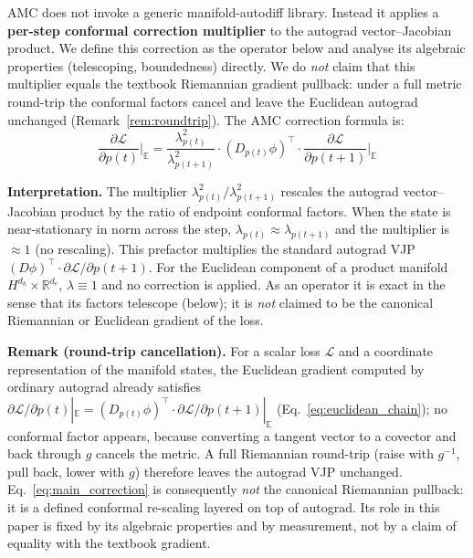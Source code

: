 \documentclass[a4paper,fleqn]{cas-dc}
\begin{document}
AMC does not invoke a generic manifold-autodiff library. Instead it applies a \textbf{per-step conformal correction multiplier} to the autograd vector--Jacobian product. We define this correction as the operator below and analyse its algebraic properties (telescoping, boundedness) directly. We do \emph{not} claim that this multiplier equals the textbook Riemannian gradient pullback: under a full metric round-trip the conformal factors cancel and leave the Euclidean autograd unchanged (Remark~\ref{rem:roundtrip}). The AMC correction formula is:
\begin{equation}
\boxed{\frac{\partial\mathcal{L}}{\partial p(t)}\bigg|_{\mathbb{E}}
 = \frac{\lambda_{p(t)}^2}{\lambda_{p(t+1)}^2}
   \cdot (D_{p(t)}\phi)^\top \cdot
   \frac{\partial\mathcal{L}}{\partial p(t+1)}\bigg|_{\mathbb{E}}}
\label{eq:main_correction}
\end{equation}

\textbf{Interpretation.} The multiplier $\lambda_{p(t)}^2 / \lambda_{p(t+1)}^2$ rescales the autograd vector--Jacobian product by the ratio of endpoint conformal factors. When the state is near-stationary in norm across the step, $\lambda_{p(t)}\approx\lambda_{p(t+1)}$ and the multiplier is $\approx 1$ (no rescaling). This prefactor multiplies the standard autograd VJP $(D\phi)^\top \cdot \partial\mathcal{L}/\partial p(t+1)$. For the Euclidean component of a product manifold $H^{d_h} \times \mathbb{R}^{d_e}$, $\lambda \equiv 1$ and no correction is applied. As an operator it is exact in the sense that its factors telescope (below); it is \emph{not} claimed to be the canonical Riemannian or Euclidean gradient of the loss.

\medskip\noindent\textbf{Remark (round-trip cancellation).}\label{rem:roundtrip} For a scalar loss $\mathcal{L}$ and a coordinate representation of the manifold states, the Euclidean gradient computed by ordinary autograd already satisfies $\partial\mathcal{L}/\partial p(t)|_{\mathbb{E}} = (D_{p(t)}\phi)^\top \cdot \partial\mathcal{L}/\partial p(t+1)|_{\mathbb{E}}$ (Eq.~\eqref{eq:euclidean_chain}); no conformal factor appears, because converting a tangent vector to a covector and back through $g$ cancels the metric. A full Riemannian round-trip (raise with $g^{-1}$, pull back, lower with $g$) therefore leaves the autograd VJP unchanged. Eq.~\eqref{eq:main_correction} is consequently \emph{not} the canonical Riemannian pullback: it is a defined conformal re-scaling layered on top of autograd. Its role in this paper is fixed by its algebraic properties and by measurement, not by a claim of equality with the textbook gradient.
\end{document}
